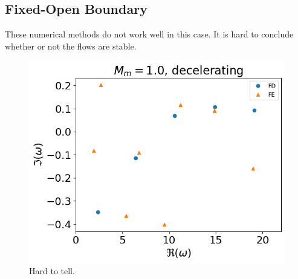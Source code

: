 \subsection{Fixed-Open Boundary}
These numerical methods do not work well in this case. It is hard to conclude whether or not the flows are stable.
\begin{figure} [H]
	\centering
	\includegraphics[width=0.7\linewidth]{img/numerical-experiments/fixed-open/decelerating-v}
	\caption{Hard to tell.}
	\label{fig:decelerating-v-fixed_open}
\end{figure}